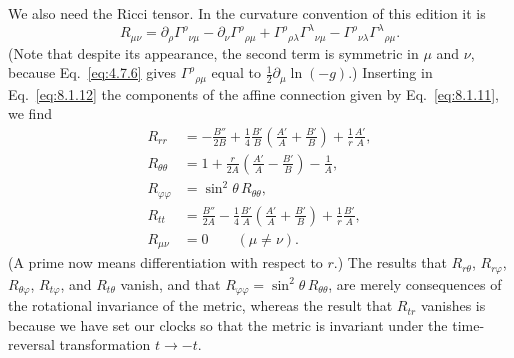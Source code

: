 We also need the Ricci tensor. In the curvature convention of this edition it
is
\begin{equation}
  R_{\mu\nu}
  =
  \partial_\rho\Gamma^\rho{}_{\nu\mu}
  -\partial_\nu\Gamma^\rho{}_{\rho\mu}
  +\Gamma^\rho{}_{\rho\lambda}\Gamma^\lambda{}_{\nu\mu}
  -\Gamma^\rho{}_{\nu\lambda}\Gamma^\lambda{}_{\rho\mu}.
  \tag{8.1.12}\label{eq:8.1.12}
\end{equation}
(Note that despite its appearance, the second term is symmetric in
\(\mu\) and \(\nu\), because Eq.~\eqref{eq:4.7.6} gives
\(\Gamma^\rho{}_{\rho\mu}\) equal to
\(\tfrac12\partial_\mu\ln(-g)\).) Inserting in Eq.~\eqref{eq:8.1.12}
the components of the affine connection given by Eq.~\eqref{eq:8.1.11},
we find
\begin{equation}
  \begin{aligned}
  R_{rr}
  &=
  -\frac{B''}{2B}
  +\frac14\frac{B'}{B}
    \left(\frac{A'}{A}+\frac{B'}{B}\right)
  +\frac1r\frac{A'}{A},
  \\
  R_{\theta\theta}
  &=
  1+\frac{r}{2A}
  \left(\frac{A'}{A}-\frac{B'}{B}\right)-\frac1A,
  \\
  R_{\varphi\varphi}
  &=\sin^2\theta\,R_{\theta\theta},
  \\
  R_{tt}
  &=
  \frac{B''}{2A}
  -\frac14\frac{B'}{A}
    \left(\frac{A'}{A}+\frac{B'}{B}\right)
  +\frac1r\frac{B'}{A},
  \\
  R_{\mu\nu}&=0\qquad(\mu\ne\nu).
  \end{aligned}
  \tag{8.1.13}\label{eq:8.1.13}
\end{equation}
(A prime now means differentiation with respect to \(r\).) The results that
\(R_{r\theta}\), \(R_{r\varphi}\), \(R_{\theta\varphi}\),
\(R_{t\varphi}\), and \(R_{t\theta}\) vanish, and that
\(R_{\varphi\varphi}=\sin^2\theta\,R_{\theta\theta}\), are merely
consequences of the rotational invariance of the metric, whereas the result
that \(R_{tr}\) vanishes is because we have set our clocks so that the metric
is invariant under the time-reversal transformation \(t\to-t\).


